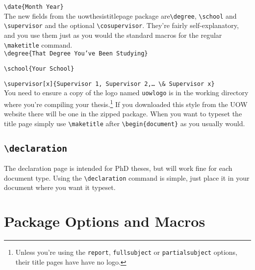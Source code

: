 \documentclass[12pt,oneside]{article}
\newcommand{\option}[1]{\texttt{\color{Green}#1}} %
\newcommand{\command}[1]{\texttt{\color{Red}#1}} %
\newcommand{\comoptions}[1]{\texttt{\color{Blue}#1}} %
\begin{document}
\command{\textbackslash{}date}\comoptions{\{Month Year\}}\\

The new fields from the uowthesistitlepage package are\command{\textbackslash{}degree}, \command{\textbackslash{}school} and \command{\textbackslash{}supervisor} and the optional \command{\textbackslash{}cosupervisor}. They're fairly self-explanatory, and you use them just as you would the standard macros for the regular \command{\textbackslash{}maketitle} command.\\
  
\command{\textbackslash{}degree}\comoptions{\{That Degree You've Been Studying\}}
 
\command{\textbackslash{}school}\comoptions{\{Your School\}}

\command{\textbackslash{}supervisor}\option{[x]}\comoptions{\{Supervisor 1, Supervisor 2,\ldots{} \textbackslash{}\& Supervisor x\}}\\

You need to ensure a copy of the logo named \texttt{uow\textunderscore{}logo} is in the working directory where you're compiling your thesis.\footnote{Unless you're using the \option{report}, \option{fullsubject} or \option{partialsubject} options, their title pages have have no logo.} If you downloaded this style from the UOW website there will be one in the zipped package. When you want to typeset the title page simply use \command{\textbackslash{}maketitle} after \command{\textbackslash{}begin}\comoptions{\{document\}} as you usually would.

\subsection*{\command{\textbackslash{}declaration}}
The declaration page is intended for PhD theses, but will work fine for each document type. Using the \command{\textbackslash{}declaration} command is simple, just place it in your document where you want it typeset. 


\section{Package Options and Macros}
\end{document}
